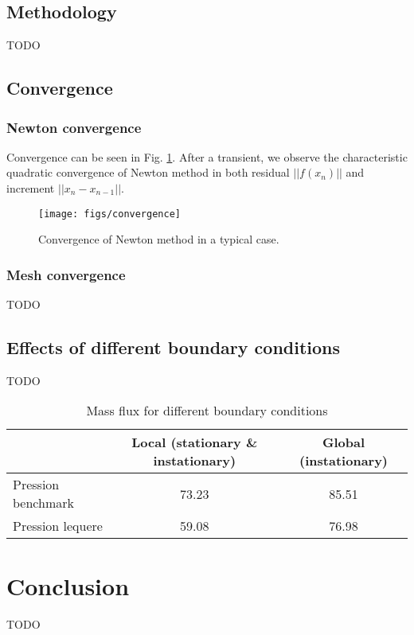 \documentclass[12pt]{article}
\begin{document}
\subsection{Methodology}
TODO
\subsection{Convergence}
\subsubsection{Newton convergence}
\label{sec:conv_newton}
Convergence can be seen in Fig. \ref{fig:conv_newton}. After a
transient, we observe the characteristic quadratic convergence of
Newton method in both residual $||f(x_n)||$ and increment $||x_{n} -
x_{n-1}||$.
\begin{figure}[htb]
\centering
\texttt{[image: figs/convergence]}
\caption{Convergence of Newton method in a typical case.}
\label{fig:conv_newton}
\end{figure}

\subsubsection{Mesh convergence}
TODO
\subsection{Effects of different boundary conditions}
TODO
\begin{table}[!h]
  \centering
  \begin{tabular}{|l|c|c|}
    \hline
    & Local (stationary \& instationary) & Global (instationary) \\
    \hline
    Pression benchmark & 73.23 & 85.51\\
    Pression lequere & 59.08 & 76.98\\
    \hline
  \end{tabular}
  \caption{Mass flux for different boundary conditions}
\end{table}
\section{Conclusion}
TODO
\listoffigures
\listoftables

\begin{thebibliography}{99}
\end{thebibliography}
\end{document}
